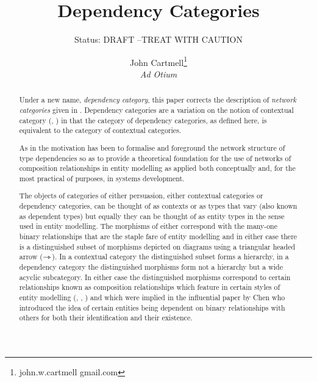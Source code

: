 \documentclass[10pt,a4paper]{scrartcl}
\title{Dependency Categories}
\author{John Cartmell\footnote{john.w.cartmell gmail.com}\\ \normalsize{\textit{Ad Otium}}}
\subtitle{Status: \normalsize{DRAFT --TREAT WITH CAUTION}}
\begin{document}
\maketitle

\begin{abstract}

\noindent Under a new name, \textit{dependency category}, this paper corrects the description of \textit{network categories} given in  
\cite{Cartmell86B}. Dependency categories are a variation on the notion of contextual category (\cite{Cartmell78}, \cite{Cartmell86}) in that  the category of dependency categories, as defined here, is equivalent to the category of contextual categories.

As in \cite{Cartmell86B} the motivation has been to formalise
and foreground the network structure of type dependencies so as to provide a theoretical foundation for the use of networks of composition relationships in entity modelling as applied both conceptually and, for the most practical of purposes, in systems development. 

The objects of  categories of either persuasion, either contextual categories or dependency categories, can be thought 
of as contexts or as types that vary (also known as dependent types) but equally they can be thought of as entity 
types in the sense used in entity modelling. The
morphisms of either correspond with the many-one binary relationships that are the staple fare of entity modelling and in either case there is a  distinguished subset of morphisms depicted on diagrams using a triangular headed arrow ($\rightarrowtriangle$). In a contextual category  the distinguished 
subset forms a hierarchy, in a dependency category the distinguished morphisms form not a hierarchy but a wide acyclic subcategory.
In either case the distinguished morphisms correspond to certain relationships known as composition relationships which feature
in certain styles of entity modelling (\cite{ECMA-149}, \cite{Munck1988}, \cite{entitymodelling}) and which were implied in the influential paper by Chen \cite{Chen1976} who introduced the idea of certain entities being dependent on binary relationships 
with others for both their identification and their existence.
\end{abstract}
\end{document}
